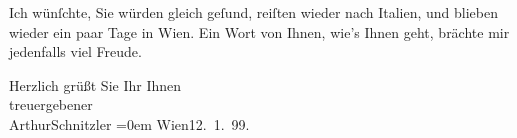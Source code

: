 \pstart
           Ich wünſchte, Sie würden gleich geſund, reiſten wieder nach Italien, und blieben wieder ein paar Tage in Wien. Ein Wort von Ihnen, wie’s Ihnen geht, brächte mir
               jedenfalls viel Freude.\pend
           
\pstart
           Herzlich grüßt Sie Ihr Ihnen {\\[\baselineskip]}treuergebener{\\[\baselineskip]}\spacefill\mbox{ArthurSchnitzler}\pend
           \leftskip=0em{}
\pstart
           Wien12. 1. 99.\pend
           \endnumbering{}  
      